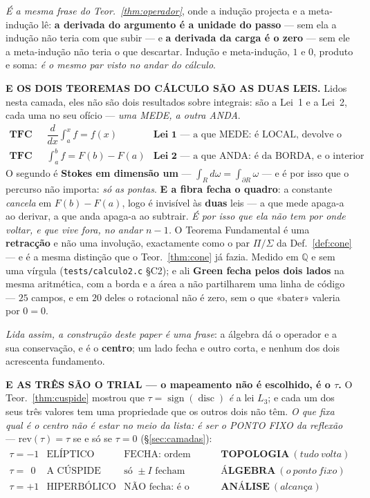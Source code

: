 \documentclass[11pt,a4paper]{article}
\newcommand{\code}[1]{\texttt{\small #1}}
\begin{document}
\emph{É a mesma frase do Teor.~\ref{thm:operador}}, onde a indução projecta e a
meta-indução lê: \textbf{a derivada do argumento é a unidade do passo} --- sem ela a
indução não teria com que subir --- e \textbf{a derivada da carga é o zero} --- sem ele a
meta-indução não teria o que descartar. Indução e meta-indução, $1$ e $0$, produto e soma:
\emph{é o mesmo par visto no andar do cálculo}.

\medskip
\noindent\textbf{E OS DOIS TEOREMAS DO CÁLCULO SÃO AS DUAS LEIS.} Lidos nesta camada, eles
não são dois resultados sobre integrais: são a Lei~1 e a Lei~2, cada uma no seu ofício ---
\emph{uma MEDE, a outra ANDA}.
\[
\boxed{
\begin{array}{lll}
\textbf{TFC I} & \dfrac{d}{dx}\displaystyle\int_a^x f = f(x) &
\textbf{Lei 1} \text{ --- a que MEDE: é LOCAL, devolve o integrando NO PONTO}\\[10pt]
\textbf{TFC II} & \displaystyle\int_a^b f = F(b)-F(a) &
\textbf{Lei 2} \text{ --- a que ANDA: é da BORDA, e o interior não conta}
\end{array}}
\]
O segundo é \textbf{Stokes em dimensão um} --- $\int_R d\omega=\int_{\partial R}\omega$ ---
e é por isso que o percurso não importa: \emph{só as pontas}. \textbf{E a fibra fecha o
quadro}: a constante \emph{cancela} em $F(b)-F(a)$, logo é invisível às \textbf{duas} leis
--- a que mede apaga-a ao derivar, a que anda apaga-a ao subtrair. \emph{É por isso que ela
não tem por onde voltar, e que vive fora, no andar $n-1$.} O Teorema Fundamental é uma
\textbf{retracção} e não uma involução, exactamente como o par $\Pi/\Sigma$ da
Def.~\ref{def:cone} --- e é a mesma distinção que o Teor.~\ref{thm:cone} já fazia. Medido
em $\mathbb{Q}$ e sem uma vírgula (\code{tests/calculo2.c} \S C2); e ali \textbf{Green
fecha pelos dois lados} na mesma aritmética, com a borda e a área a não partilharem uma
linha de código --- $25$ campos, e em $20$ deles o rotacional não é zero, sem o que
«bater» valeria por $0=0$.

\emph{Lida assim, a construção deste paper é uma frase}: a álgebra dá o operador e a sua
conservação, e é o \textbf{centro}; um lado fecha e outro corta, e nenhum dos dois
acrescenta fundamento.

\medskip
\noindent\textbf{E AS TRÊS SÃO O TRIAL --- o mapeamento não é escolhido, é o $\tau$.} O
Teor.~\ref{thm:cuspide} mostrou que $\tau=\operatorname{sign}(\operatorname{disc})$ \emph{é}
a lei $L_3$; e cada um dos seus três valores tem uma propriedade que os outros dois não
têm. \emph{O que fixa qual é o centro não é estar no meio da lista: é ser o PONTO FIXO da
reflexão} --- $\mathrm{rev}(\tau)=\tau$ se e só se $\tau=0$ (\S\ref{sec:camadas}):
\[
\boxed{
\begin{array}{llll}
\tau=-1 & \text{ELÍPTICO} & \text{FECHA: ordem finita} & \textbf{TOPOLOGIA}\ (tudo\ volta)\\[2pt]
\tau=\ \ 0 & \text{A CÚSPIDE} & \text{só }\pm I\text{ fecham} & \textbf{ÁLGEBRA}\ (o\ ponto\ fixo)\\[2pt]
\tau=+1 & \text{HIPERBÓLICO} & \text{NÃO fecha: é o CORTE} & \textbf{ANÁLISE}\ (alcança)
\end{array}}
\]
\end{document}
